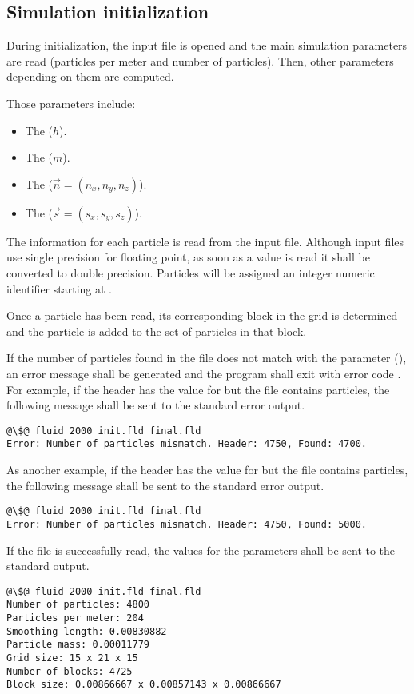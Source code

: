 \subsection{Simulation initialization}

During initialization, the input file is opened and the main simulation
parameters are read (particles per meter and number of particles).
Then, other parameters depending on them are computed.

Those parameters include:
\begin{itemize}
\item The  ($h$).
\item The  ($m$).
\item The  ($\vec{n} = (n_x, n_y, n_z)$).
\item The  ($\vec{s} = (s_x, s_y, s_z)$).
\end{itemize}

The information for each particle is read from the input file. Although input
files use single precision for floating point, as soon as a value is read it
shall be converted to double precision.  Particles will be assigned an integer
numeric identifier starting at .

Once a particle has been read, its corresponding block in the grid is determined
and the particle is added to the set of particles in that block. 

If the number of particles found in the file does not match with the parameter
 (), an error message shall be generated
and the program shall exit with error code . For example, if the 
header has the value  for  but the file contains 
 particles, the following message shall be sent to the standard
error output.

\begin{lstlisting}[style=terminal,escapechar=@]
@\$@ fluid 2000 init.fld final.fld
Error: Number of particles mismatch. Header: 4750, Found: 4700.
\end{lstlisting}

As another example, if the header has the value  for  but
the file contains  particles, the following message shall be sent to
the standard error output.

\begin{lstlisting}[style=terminal,escapechar=@]
@\$@ fluid 2000 init.fld final.fld
Error: Number of particles mismatch. Header: 4750, Found: 5000.
\end{lstlisting}

If the file is successfully read, the values for the parameters shall be sent
to the standard output.

\begin{lstlisting}[style=terminal,escapechar=@]
@\$@ fluid 2000 init.fld final.fld
Number of particles: 4800
Particles per meter: 204
Smoothing length: 0.00830882
Particle mass: 0.00011779
Grid size: 15 x 21 x 15
Number of blocks: 4725
Block size: 0.00866667 x 0.00857143 x 0.00866667
\end{lstlisting}

